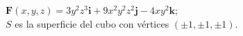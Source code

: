 \item $\mathbf{F}(x, y, z) = 3y^2z^3\mathbf{i} + 9x^2y^2z^2\mathbf{j} - 4xy^2\mathbf{k}$;\\
    $S$ es la superficie del cubo con vértices $(\pm 1, \pm 1, \pm 1)$.
